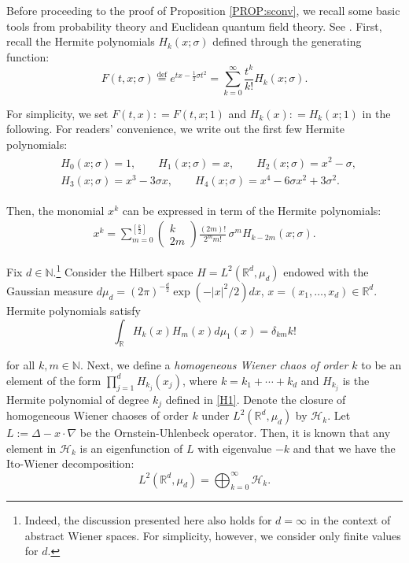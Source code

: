 \documentclass[letterpaper, 11pt,  reqno]{amsart}
\newcommand{\1}{\hspace{0.5mm}\text{I}\hspace{0.5mm}}
\newcommand{\noi}{\noindent}
\newcommand{\R}{\mathbb{R}}
\newcommand{\Dl}{\Delta}
\newcommand{\s}{\sigma}
\newcommand{\N}{\mathbb{N}}
\numberwithin{equation}{section}
\numberwithin{theorem}{section}
\begin{document}
Before proceeding to the proof of Proposition \ref{PROP:sconv}, 
we recall some basic tools from probability theory and Euclidean quantum field theory.
See \cite{Kuo, Nu, Simon}.
First, 
recall the Hermite polynomials $H_k(x; \s)$
defined through the generating function:
\begin{equation}
F(t, x; \s) \stackrel{\text{def}}{=}  e^{tx - \frac{1}{2}\s t^2} = \sum_{k = 0}^\infty \frac{t^k}{k!} H_k(x;\s).
\label{H1}
 \end{equation}
	
\noi
For simplicity, we set $F(t, x) : = F(t, x; 1)$
and $H_k(x) : = H_k(x; 1)$ in the following.
For readers' convenience, we write out the first few Hermite polynomials:
\begin{align}
\begin{split}
& H_0(x; \s) = 1, 
\qquad 
H_1(x; \s) = x, 
\qquad
H_2(x; \s) = x^2 - \s,   \\
& H_3(x; \s) = x^3 - 3\s x, 
\qquad 
H_4(x; \s) = x^4 - 6\s x^2 +3\s^2.
\end{split}
\label{H1a}
\end{align}
	
\noi
Then, the monomial $x^k$
can be expressed in term of the Hermite polynomials:
\begin{align}
x^k = \sum_{m = 0}^{[\frac{k}{2}]}
\begin{pmatrix}
k\\2m 
\end{pmatrix}
\frac{(2m)!}{2^m m!}\, \s^m H_{k-2m}(x; \s).
\label{H2}
\end{align}


Fix $d \in \N$.\footnote{Indeed, the discussion presented here also holds for $d = \infty$ 
in the context of abstract Wiener spaces.
For simplicity, however, we consider only finite values for $d$.} Consider the Hilbert space $H = L^2(\R^d, \mu_d)$
endowed with  the Gaussian measure 
 $d\mu_d
= (2\pi)^{-\frac{d}{2}} \exp(-{|x|^2}/{2})dx$, $x = (x_1, \dots,
x_d)\in \R^d$. 
Hermite polynomials satisfy
\begin{equation}
\int_{\R} H_k(x)H_m(x) d\mu_1(x)= \delta_{k m} k!
\label{H3}
\end{equation}


\noi
for all  $k,m\in\N$.
Next, we define a {\it homogeneous Wiener chaos of order
$k$} to be an element of the form $\prod_{j = 1}^d H_{k_j}(x_j)$, 
where $k= k_1 + \cdots + k_d$
and $H_{k_j}$ is the Hermite polynomial of degree $k_j$ defined in \eqref{H1}. 
Denote the closure of homogeneous Wiener chaoses of order $k$
under $L^2(\R^d, \mu_d)$ by $\mathcal{H}_k$.
Let $L := \Dl -x \cdot \nabla$ be 
 the Ornstein-Uhlenbeck operator. 
Then, 
it is known that 
any element in $\mathcal H_k$ 
is an eigenfunction of $L$ with eigenvalue $-k$
and that we have the Ito-Wiener decomposition:
\[ L^2(\R^d, \mu_d) = \bigoplus_{k = 0}^\infty \mathcal{H}_k.\]
\end{document}
